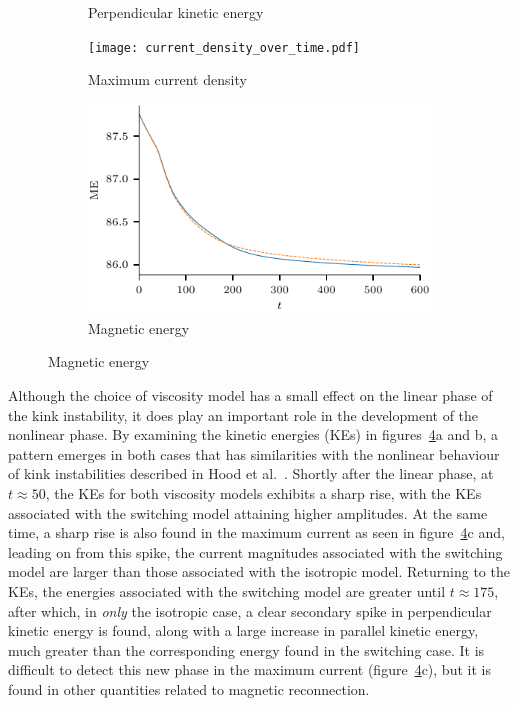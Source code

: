 \begin{figure}[t]
\begin{subfigure}[t]{0.49\textwidth}
      \caption{Perpendicular kinetic energy}
      \label{fig:perp_kinetic_energy_over_time}
    \end{subfigure}
    \begin{subfigure}[t]{0.49\textwidth}
      \centering
      \texttt{[image: current\_density\_over\_time.pdf]}
      \caption{Maximum current density}
      \label{fig:current_density_over_time}
    \end{subfigure}
    \begin{subfigure}[t]{0.49\textwidth}
      \centering
      \includegraphics[width=\linewidth]{magnetic_energy_density_over_time.pdf}
      \caption{Magnetic energy}
      \label{fig:magnetic_energy_density_over_time}
    \end{subfigure}
    \label{fig:energies}
\end{figure}

Although the choice of viscosity model has a small effect on the
linear phase of the kink instability, it does play an important role
in the development of the nonlinear phase. By examining the kinetic
energies (KEs) in figures~\ref{fig:energies}a and b, a pattern
emerges in both cases that has similarities with the nonlinear
  behaviour of kink instabilities described in Hood et
al.~\cite{hoodCoronalHeatingMagnetic2009}. Shortly after the linear
phase, at $t\approx50$, the KEs for both viscosity models
exhibits a sharp rise, with the KEs associated with the switching
model attaining higher amplitudes. At the same time, a sharp rise is
also found in the maximum current as seen in
figure~\ref{fig:energies}c and, leading on from this spike, the
current magnitudes associated with the switching model are larger than
those associated with the isotropic model. Returning to the KEs, the
energies associated with the switching model are greater until
$t\approx175$, after which, in \emph{only} the isotropic case, 
a clear secondary spike in perpendicular kinetic energy is found, along with a large
increase in parallel kinetic energy, much greater than the corresponding energy
found in the switching case. It is difficult to detect this new phase
in the maximum current (figure~\ref{fig:energies}c), but it is found
in other quantities related to magnetic reconnection. 

